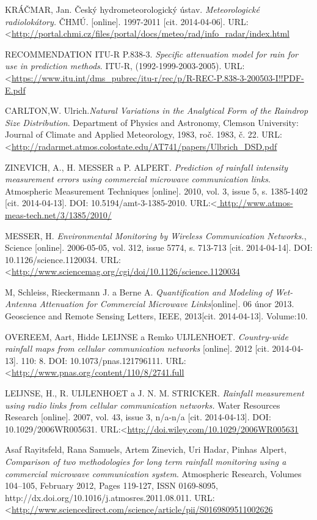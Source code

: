\documentclass[a4paper,12pt]{article}
\begin{document}
\begin{thebibliography}{99}
KRÁČMAR, Jan. Český hydrometeorologický ústav. \textit{Meteorologické radiolokátory.} ČHMÚ.
[online]. 1997-2011 [cit. 2014-04-06]. URL:\textless\url {http://portal.chmi.cz/files/portal/docs/meteo/rad/info_radar/index.html}

RECOMMENDATION ITU-R P.838-3. \textit{Specific attenuation model for rain for use in prediction methods}. 
ITU-R, (1992-1999-2003-2005). URL:\textless\url {https://www.itu.int/dms_pubrec/itu-r/rec/p/R-REC-P.838-3-200503-I!!PDF-E.pdf}

CARLTON,W. Ulrich.\textit {Natural Variations in the Analytical Form of the Raindrop Size Distribution}. 
Department of Physics and Astronomy, Clemson University: Journal of Climate and Applied Meteorology, 1983, roč. 1983, č. 22. URL:\textless\url {http://radarmet.atmos.colostate.edu/AT741/papers/Ulbrich_DSD.pdf}

ZINEVICH, A., H. MESSER a P. ALPERT. \textit {Prediction of rainfall intensity measurement errors using commercial microwave communication links}. Atmospheric Measurement Techniques [online]. 2010, vol. 3, issue 5, s. 1385-1402 [cit. 2014-04-13]. DOI: 10.5194/amt-3-1385-2010. URL:\textless\url { http://www.atmos-meas-tech.net/3/1385/2010/}

MESSER, H. \textit {Environmental Monitoring by Wireless Communication Networks.}, Science [online]. 2006-05-05, vol. 312, issue 5774, s. 713-713 [cit. 2014-04-14]. DOI: 10.1126/science.1120034. URL:\textless\url {http://www.sciencemag.org/cgi/doi/10.1126/science.1120034}

M, Schleiss, Rieckermann J. a Berne A.  \textit{Quantification and Modeling of Wet-Antenna Attenuation for Commercial Microwave Links}[online]. 06 únor 2013. Geoscience and Remote Sensing Letters, IEEE, 2013[cit. 2014-04-13]. Volume:10. 

OVEREEM, Aart, Hidde LEIJNSE a Remko UIJLENHOET.  \textit{Country-wide rainfall maps from cellular communication networks} [online]. 2012 [cit. 2014-04-13]. 110: 8. DOI: 10.1073/pnas.121796111. URL:\textless\url {http://www.pnas.org/content/110/8/2741.full}

LEIJNSE, H., R. UIJLENHOET a J. N. M. STRICKER. \textit{Rainfall measurement using radio links from cellular communication networks.} Water Resources Research [online]. 2007, vol. 43, issue 3, n/a-n/a [cit. 2014-04-13]. DOI: 10.1029/2006WR005631. URL:\textless\url {http://doi.wiley.com/10.1029/2006WR005631}

Asaf Rayitsfeld, Rana Samuels, Artem Zinevich, Uri Hadar, Pinhas Alpert, \textit{Comparison of two methodologies for long term rainfall monitoring using a commercial microwave communication system}. Atmospheric Research, Volumes 104–105, February 2012, Pages 119-127, ISSN 0169-8095, http://dx.doi.org/10.1016/j.atmosres.2011.08.011.
URL:\textless\url {http://www.sciencedirect.com/science/article/pii/S0169809511002626}



\end{thebibliography}
\end{document}
